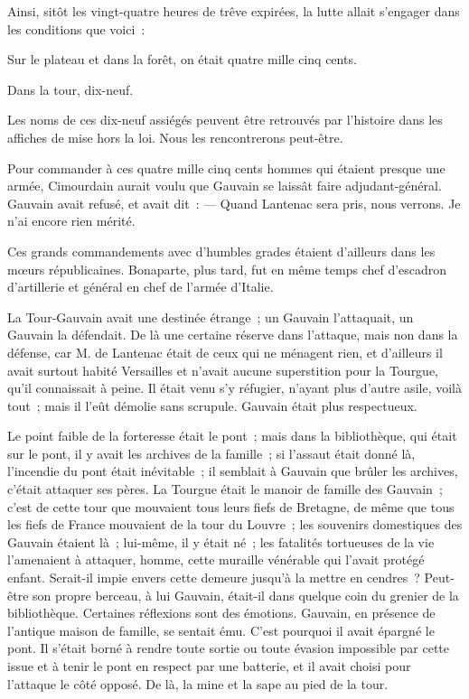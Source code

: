 \documentclass[french,twoside]{book} %
\begin{document}
Ainsi, sitôt les vingt-quatre heures de trêve expirées, la lutte allait s’engager dans les conditions que voici :\par
 Sur le plateau et dans la forêt, on était quatre mille cinq cents.\par
Dans la tour, dix-neuf.\par
Les noms de ces dix-neuf assiégés peuvent être retrouvés par l’histoire dans les affiches de mise hors la loi. Nous les rencontrerons peut-être.\par
Pour commander à ces quatre mille cinq cents hommes qui étaient presque une armée, Cimourdain aurait voulu que Gauvain se laissât faire adjudant-général. Gauvain avait refusé, et avait dit : — Quand Lantenac sera pris, nous verrons. Je n’ai encore rien mérité.\par
Ces grands commandements avec d’humbles grades étaient d’ailleurs dans les mœurs républicaines. Bonaparte, plus tard, fut en même temps chef d’escadron d’artillerie et général en chef de l’armée d’Italie.\par
La Tour-Gauvain avait une destinée étrange ; un Gauvain l’attaquait, un Gauvain la défendait. De là une certaine réserve dans l’attaque, mais non dans la défense, car M. de Lantenac était de ceux qui ne ménagent rien, et d’ailleurs il avait surtout habité Versailles et n’avait aucune superstition pour la Tourgue, qu’il connaissait à peine. Il était venu s’y réfugier, n’ayant plus d’autre asile, voilà tout ; mais il l’eût démolie sans scrupule. Gauvain était plus respectueux.\par
Le point faible de la forteresse était le pont ; mais dans la bibliothèque, qui était sur le pont, il y avait les archives de la famille ; si l’assaut était donné là,  l’incendie du pont était inévitable ; il semblait à Gauvain que brûler les archives, c’était attaquer ses pères. La Tourgue était le manoir de famille des Gauvain ; c’est de cette tour que mouvaient tous leurs fiefs de Bretagne, de même que tous les fiefs de France mouvaient de la tour du Louvre ; les souvenirs domestiques des Gauvain étaient là ; lui-même, il y était né ; les fatalités tortueuses de la vie l’amenaient à attaquer, homme, cette muraille vénérable qui l’avait protégé enfant. Serait-il impie envers cette demeure jusqu’à la mettre en cendres ? Peut-être son propre berceau, à lui Gauvain, était-il dans quelque coin du grenier de la bibliothèque. Certaines réflexions sont des émotions. Gauvain, en présence de l’antique maison de famille, se sentait ému. C’est pourquoi il avait épargné le pont. Il s’était borné à rendre toute sortie ou toute évasion impossible par cette issue et à tenir le pont en respect par une batterie, et il avait choisi pour l’attaque le côté opposé. De là, la mine et la sape au pied de la tour.\par
\end{document}
